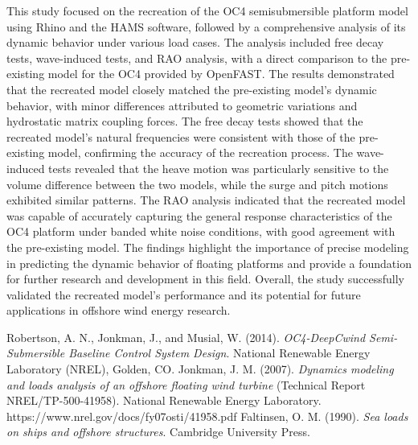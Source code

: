 \documentclass[a4paper, 11pt]{article}
\begin{document}
\hspace*{0.5cm}This study focused on the recreation of the OC4 semisubmersible platform model using Rhino and the HAMS software, followed by a comprehensive analysis of its dynamic behavior under various load cases. The analysis included free decay tests, wave-induced tests, and RAO analysis, with a direct comparison to the pre-existing model for the OC4 provided by OpenFAST. The results demonstrated that the recreated model closely matched the pre-existing model's dynamic behavior, with minor differences attributed to geometric variations and hydrostatic matrix coupling forces. The free decay tests showed that the recreated model's natural frequencies were consistent with those of the pre-existing model, confirming the accuracy of the recreation process. The wave-induced tests revealed that the heave motion was particularly sensitive to the volume difference between the two models, while the surge and pitch motions exhibited similar patterns. The RAO analysis indicated that the recreated model was capable of accurately capturing the general response characteristics of the OC4 platform under banded white noise conditions, with good agreement with the pre-existing model. The findings highlight the importance of precise modeling in predicting the dynamic behavior of floating platforms and provide a foundation for further research and development in this field. Overall, the study successfully validated the recreated model's performance and its potential for future applications in offshore wind energy research.

\newpage
\begin{thebibliography}{99} %

 Robertson, A. N., Jonkman, J., and Musial, W. (2014). \textit{OC4-DeepCwind Semi-Submersible Baseline Control System Design}. National Renewable Energy Laboratory (NREL), Golden, CO.
 Jonkman, J. M. (2007). \textit{Dynamics modeling and loads analysis of an offshore floating wind turbine} (Technical Report NREL/TP-500-41958). National Renewable Energy Laboratory. https://www.nrel.gov/docs/fy07osti/41958.pdf
 Faltinsen, O. M. (1990). \textit{Sea loads on ships and offshore structures}. Cambridge University Press.


\end{thebibliography}
\end{document}

